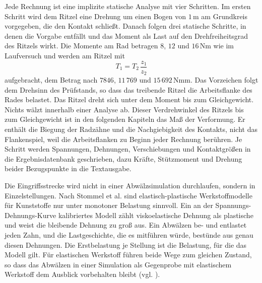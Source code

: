 
Jede Rechnung ist eine implizite statische Analyse mit vier Schritten. Im ersten Schritt wird dem Ritzel eine Drehung um einen Bogen von $1$\,\textmu m am Grundkreis vorgegeben, die den Kontakt schließt. Danach folgen drei statische Schritte, in denen die Vorgabe entfällt und das Moment als Last auf den Drehfreiheitsgrad des Ritzels wirkt. Die Momente am Rad betragen $8$, $12$ und $16$\,Nm wie im Laufversuch und werden am Ritzel mit
\begin{equation}
	T_1 = T_2 \, \frac{z_1}{z_2}
	\label{eq:moment_ritzel}
\end{equation}
aufgebracht, dem Betrag nach $7846$, $11\,769$ und $15\,692$\,Nmm. Das Vorzeichen folgt dem Drehsinn des Prüfstands, so dass das treibende Ritzel die Arbeitsflanke des Rades belastet. Das Ritzel dreht sich unter dem Moment bis zum Gleichgewicht. Nichts wälzt innerhalb einer Analyse ab. Dieser Verdrehwinkel des Ritzels bis zum Gleichgewicht ist in den folgenden Kapiteln das Maß der Verformung. Er enthält die Biegung der Radzähne und die Nachgiebigkeit des Kontakts, nicht das Flankenspiel, weil die Arbeitsflanken zu Beginn jeder Rechnung berühren. Je Schritt werden Spannungen, Dehnungen, Verschiebungen und Kontaktgrößen in die Ergebnisdatenbank geschrieben, dazu Kräfte, Stützmoment und Drehung beider Bezugspunkte in die Textausgabe.


Die Eingriffsstrecke wird nicht in einer Abwälzsimulation durchlaufen, sondern in Einzelstellungen. Nach Stommel et al. \cite[S.~56 bis 57]{Sto18} sind elastisch-plastische Werkstoffmodelle für Kunststoffe nur unter monotoner Belastung sinnvoll. Ein an der Spannungs-Dehnungs-Kurve kalibriertes Modell zählt viskoelastische Dehnung als plastische und weist die bleibende Dehnung zu groß aus. Ein Abwälzen be- und entlastet jeden Zahn, und die Lastgeschichte, die es mitführen würde, bestünde aus genau diesen Dehnungen. Die Erstbelastung je Stellung ist die Belastung, für die das Modell gilt. Für elastischen Werkstoff führen beide Wege zum gleichen Zustand, so dass das Abwälzen in einer Simulation als Gegenprobe mit elastischem Werkstoff dem Ausblick vorbehalten bleibt (vgl. ).

